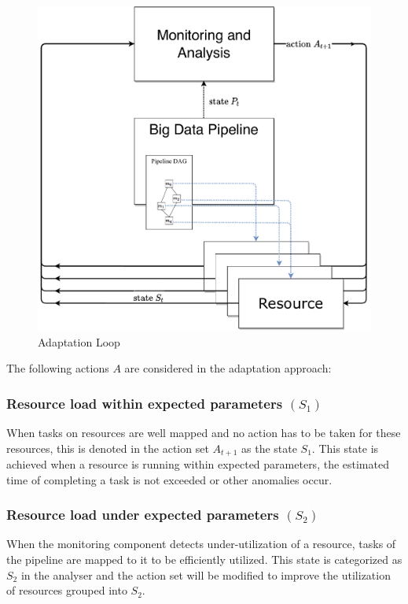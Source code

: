         \begin{figure}[h!]
            \centering
            \includegraphics[width=\columnwidth]{figures/monitoring_with_inner_resources.drawio.pdf}
            \caption{Adaptation Loop}
            \label{fig:adaptation-loop}
        \end{figure}
        The following actions $A$ are considered in the adaptation approach:

        \subsubsection*{Resource load within expected parameters $(S_1)$} 
        When tasks on resources are well mapped and no action has to be taken for these resources, this is denoted in the action set $A_{t+1}$ as the state $S_1$. This state is achieved when a resource is running within expected parameters, the estimated time of completing a task is not exceeded or other anomalies occur.

        \subsubsection*{Resource load under expected parameters $(S_2)$} 
        When the monitoring component detects under-utilization of a resource, tasks of the pipeline are mapped to it to be efficiently utilized. This state is categorized as $S_2$ in the analyser and the action set will be modified to improve the utilization of resources grouped into $S_2$. 

